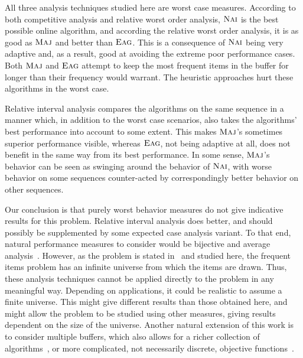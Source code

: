 \documentclass[11pt]{article}
\newcommand{\maj}{{\ensuremath{\textsc{Maj}}}\xspace}
\newcommand{\nav}{{\ensuremath{\textsc{Nai}}}\xspace}
\newcommand{\eag}{{\ensuremath{\textsc{Eag}}}\xspace}
\begin{document}
All three analysis techniques studied here are worst case measures.
According to both competitive analysis and relative worst order analysis,
\nav is the best possible online algorithm, and according the
relative worst order analysis, it is as good as \maj and better than
\eag. This is a consequence of \nav being very adaptive and, as a result,
good at avoiding the extreme poor performance cases.
Both \maj and \eag attempt to
keep the most frequent items in the buffer for longer
than their frequency would warrant. The heuristic approaches hurt
these algorithms in the worst case.

Relative interval analysis compares the algorithms on the same sequence
in a manner which, in addition to the worst case scenarios, also
takes the algorithms' best performance into account
to some extent. This makes \maj's sometimes superior performance visible,
whereas \eag, not being adaptive at all, does not benefit in the same way from
its best performance.
In some sense, \maj's behavior can be seen as swinging around the
behavior of \nav, with worse behavior on some sequences counter-acted
by correspondingly better behavior on other sequences.

Our conclusion is that purely worst behavior measures do not give
indicative results for this problem. Relative interval analysis does
better, and should possibly be supplemented by some expected case
analysis variant.
To that end, natural performance measures to consider would be
bijective and average analysis~\cite{Angelopoulos07}.
However, as the problem is stated in~\cite{Giannakopoulos12} and studied here,
the frequent items problem has an infinite universe from which the
items are drawn. Thus, these analysis techniques
cannot be applied directly to the problem in any meaningful way.
Depending on applications, it could be realistic to assume a finite universe.
This might give different results than those obtained here, and might allow
the problem to be studied using other measures, giving results dependent on the size of the universe.
Another natural extension of this work is to consider multiple buffers, which
also allows for a richer collection of algorithms~\cite{Berinde09},
or more complicated, not necessarily discrete, objective
functions~\cite{Cohen06}.





\end{document}
